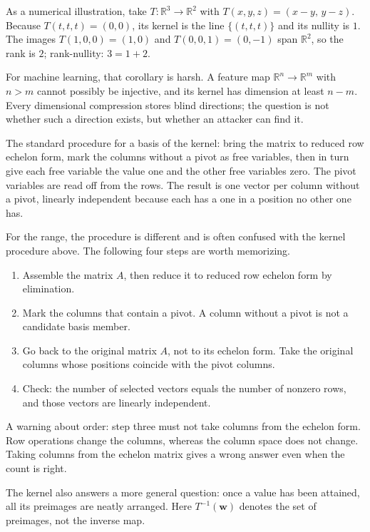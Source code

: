 As a numerical illustration, take $T\colon\mathbb{R}^{3}\to\mathbb{R}^{2}$ with
$T(x,y,z)=(x-y,\,y-z)$. Because $T(t,t,t)=(0,0)$, its kernel is the line $\{(t,t,t)\}$ and its nullity is
$1$.
The images $T(1,0,0)=(1,0)$ and $T(0,0,1)=(0,-1)$ span $\mathbb{R}^{2}$, so the rank is $2$;
rank-nullity: $3=1+2$.

For machine learning, that corollary is harsh. A feature map $\mathbb{R}^{n}\to\mathbb{R}^{m}$
with $n>m$ cannot possibly be injective, and its kernel has dimension at least $n-m$. Every dimensional
compression stores blind directions; the question is not whether such a direction exists, but
whether an attacker can find it.

The standard procedure for a basis of the kernel: bring the matrix to reduced row echelon form, mark the columns
without a pivot as free variables, then in turn give each free variable the value one and the other
free variables zero. The pivot variables are read off from the rows. The result is one vector per
column without a pivot, linearly independent because each has a one in a position no other
one has.

For the range, the procedure is different and is often confused with the kernel procedure above. The following
four steps are worth memorizing.

\begin{resep}
\begin{enumerate}
  \item Assemble the matrix $A$, then reduce it to reduced row echelon form by elimination.
  \item Mark the columns that contain a pivot. A column without a pivot is not a candidate basis member.
  \item Go back to the original matrix $A$, not to its echelon form. Take the original columns whose positions
        coincide with the pivot columns.
  \item Check: the number of selected vectors equals the number of nonzero rows, and those vectors are
        linearly independent.
\end{enumerate}
A warning about order: step three must not take columns from the echelon form. Row operations
change the columns, whereas the column space does not change. Taking columns from the echelon matrix
gives a wrong answer even when the count is right.
\end{resep}

The kernel also answers a more general question: once a value has been attained, all its
preimages are neatly arranged. Here $T^{-1}(\mathbf{w})$ denotes the set of preimages, not the inverse
map.


